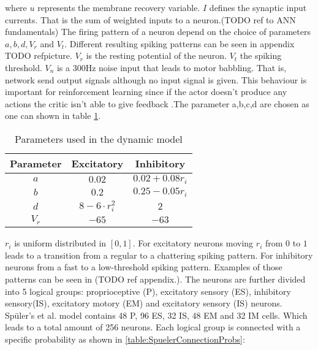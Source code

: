 where $u$ represents the membrane recovery variable. $I$ defines the synaptic input currents. That is the sum of weighted inputs to a neuron.(TODO ref to ANN fundamentals) The firing pattern of a neuron depend on the choice of parameters $a,b,d,V_r$ and $V_t$. Different resulting spiking patterns can be seen in appendix TODO  refpicture. $V_r$ is the resting potential of the neuron. $V_t$ the spiking threshold. $V_n$ is a 300Hz noise input that leads to motor babbling. That is, network send output signals although no input signal is given. This behaviour is important for reinforcement learning since if the actor doesn't produce any actions the critic isn't able to give feedback \cite{chadderdonNeuronalModel}.The parameter a,b,c,d are chosen as one can shown in table \ref{table:DynamiModelParams}.
\begin{table}[h]
	\centering
	\begin{tabular}{ |c||c|c|  }		
		\hline
		Parameter & Excitatory & Inhibitory \\
 		\hline
 		$a$&$0.02$& $0.02+0.08r_i$\\
 		$b$&$0.2$& $0.25-0.05r_i$\\
 		$d$&$8-6\cdot r_i^2$& $2$\\
 		$V_r$&$-65$& $-63$\\
 		\hline
	\end{tabular}
	\caption[Dynamic model's parameters ]{Parameters used in the dynamic model }
	\label{table:DynamiModelParams}
\end{table}


$r_i$ is uniform distributed in  $[0,1]$. For excitatory neurons moving $r_i$ from $0$ to $1$ leads to a transition from a regular to a chattering spiking pattern. For inhibitory neurons from a fast to a low-threshold spiking pattern. Examples of those patterns can be seen in (TODO ref appendix.).
The neurons are further divided into 5 logical groups: proprioceptive (P), excitatory sensory (ES), inhibitory sensory(IS), excitatory motory (EM) and excitatory sensory (IS) neurons.  Spüler's et al. model contains 48 P, 96 ES, 32 IS, 48 EM and 32 IM cells. Which leads to a total amount of 256 neurons.
Each logical group is connected with a specific probability as shown in \ref{table:SpuelerConnectionProbs}:

